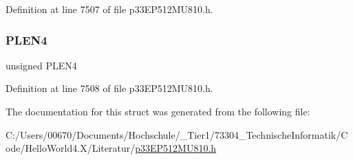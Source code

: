 Definition at line 7507 of file p33\+E\+P512\+M\+U810.\+h.

\mbox{\label{structtag_c_r_c_c_o_n2_b_i_t_s_a782eba6f760da4a0c40dbab45d487931}} 
\subsubsection{\texorpdfstring{P\+L\+E\+N4}{PLEN4}}
{\footnotesize\ttfamily unsigned P\+L\+E\+N4}



Definition at line 7508 of file p33\+E\+P512\+M\+U810.\+h.



The documentation for this struct was generated from the following file\+:\begin{DoxyCompactItemize}
\item 
C\+:/\+Users/00670/\+Documents/\+Hochschule/\+\_\+\+Tier1/73304\+\_\+\+Technische\+Informatik/\+Code/\+Hello\+World4.\+X/\+Literatur/\hyperlink{p33_e_p512_m_u810_8h}{p33\+E\+P512\+M\+U810.\+h}\end{DoxyCompactItemize}
